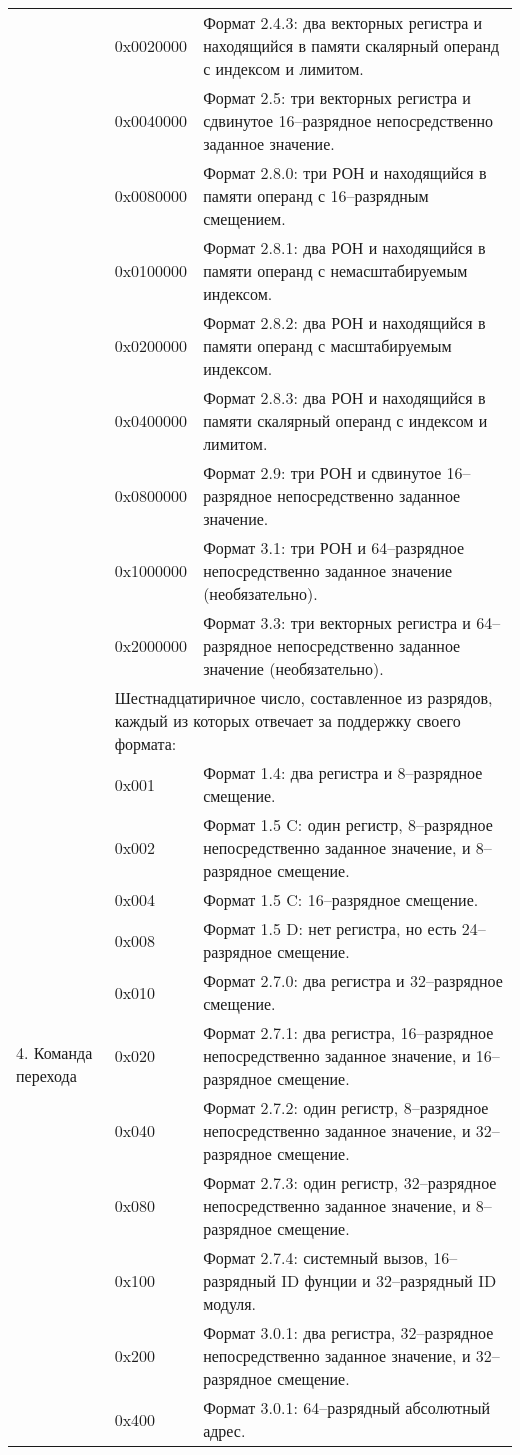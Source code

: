 \documentclass[forwardcom.tex]{subfiles}
\begin{document}
\begin{longtable} {|p{26mm}|p{16mm} p{100mm}|}
	&  0x0020000 & Формат 2.4.3: два векторных регистра и находящийся в памяти скалярный операнд с индексом и лимитом. \\
	&  0x0040000 & Формат 2.5: три векторных регистра и сдвинутое 16--разрядное непосредственно заданное значение. \\
	&  0x0080000 & Формат 2.8.0: три РОН и находящийся в памяти операнд с 16--разрядным смещением. \\
	&  0x0100000 & Формат 2.8.1: два РОН и находящийся в памяти операнд с немасштабируемым индексом. \\
	&  0x0200000 & Формат 2.8.2: два РОН и находящийся в памяти операнд с масштабируемым индексом. \\
	&  0x0400000 & Формат 2.8.3: два РОН и находящийся в памяти скалярный операнд с индексом и лимитом. \\
	&  0x0800000 & Формат 2.9: три РОН и сдвинутое 16--разрядное непосредственно заданное значение. \\
	&  0x1000000 & Формат 3.1: три РОН и 64--разрядное непосредственно заданное значение (необязательно). \\
	&  0x2000000 & Формат 3.3: три векторных регистра и 64--разрядное непосредственно заданное значение (необязательно). \\ 	\hline
	\multirow{12}{*}{\parbox[t]{26mm}{4. Команда перехода}} 
	&  \multicolumn{2}{|p{120mm}|}{Шестнадцатиричное число, составленное из разрядов, каждый из которых отвечает за поддержку своего формата:} \\
	&  0x001 & Формат 1.4: два регистра и 8--разрядное смещение. \\
	&  0x002 & Формат 1.5 C: один регистр, 8--разрядное непосредственно заданное значение, и 8--разрядное смещение. \\
	&  0x004 & Формат 1.5 C: 16--разрядное смещение. \\
	&  0x008 & Формат 1.5 D: нет регистра, но есть 24--разрядное смещение. \\
	&  0x010 & Формат 2.7.0: два регистра и 32--разрядное смещение. \\
	&  0x020 & Формат 2.7.1: два регистра, 16--разрядное непосредственно заданное значение, и 16--разрядное смещение. \\
	&  0x040 & Формат 2.7.2: один регистр, 8--разрядное непосредственно заданное значение, и 32--разрядное смещение. \\
	&  0x080 & Формат 2.7.3: один регистр, 32--разрядное непосредственно заданное значение, и 8--разрядное смещение. \\
	&  0x100 & Формат 2.7.4: системный вызов, 16--разрядный ID фунции и 32--разрядный ID модуля. \\
	&  0x200 & Формат 3.0.1: два регистра, 32--разрядное непосредственно заданное значение, и 32--разрядное смещение. \\
	&  0x400 & Формат 3.0.1: 64--разрядный абсолютный адрес. \\ 	\hline
\end{longtable}
\end{document}
